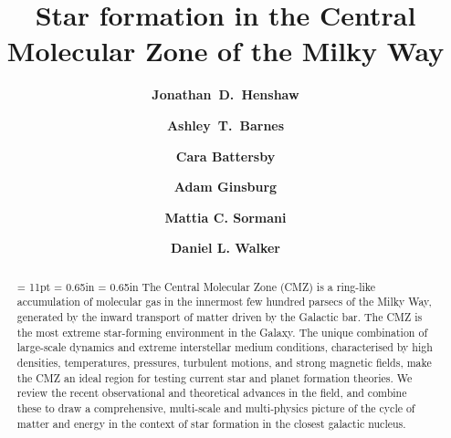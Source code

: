 \documentclass[preprint2]{pp7}
\begin{document}
    

\title{\textbf{\LARGE Star formation in the Central Molecular Zone of the Milky Way }}

\author {\textbf{\large Jonathan~D.~Henshaw}}
\author {\textbf{\large Ashley~T.~Barnes}}
\author {\textbf{\large Cara Battersby}}
\author {\textbf{\large Adam Ginsburg}}
\author {\textbf{\large Mattia C. Sormani}}
\author {\textbf{\large Daniel L. Walker}}


\begin{abstract}
\baselineskip = 11pt
\leftskip = 0.65in 
\rightskip = 0.65in
\parindent=1pc
 {\small The Central Molecular Zone (CMZ) is a ring-like accumulation of molecular gas in the innermost few hundred parsecs of the Milky Way, generated by the inward transport of matter driven by the Galactic bar. The CMZ is the most extreme star-forming environment in the Galaxy. The unique combination of large-scale dynamics and extreme interstellar medium conditions, characterised by high densities, temperatures, pressures, turbulent motions, and strong magnetic fields, make the CMZ an ideal region for testing current star and planet formation theories. 
We review the recent observational and theoretical advances in the field, and combine these to draw a comprehensive, multi-scale and multi-physics picture of the cycle of matter and energy in the context of star formation in the closest galactic nucleus.
 \\~\\~\\~}
\end{abstract}  
\end{document}
